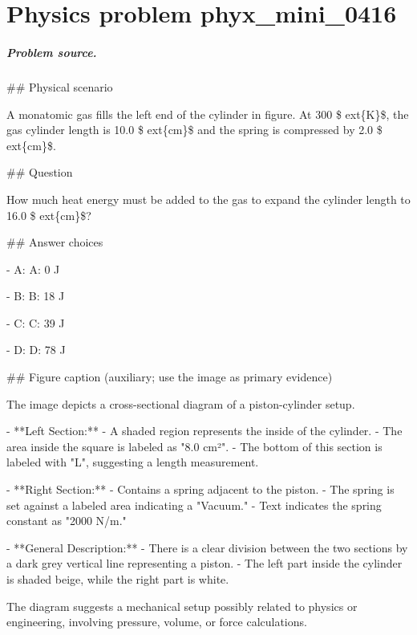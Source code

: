 
\chapter{Physics problem phyx\_mini\_0416}
\label{ch:PhyXMiniProblems_problem_phyx_mini_0416}

\paragraph{Problem source.}
\#\# Physical scenario

A monatomic gas fills the left end of the cylinder in figure. At 300 \$	ext\{K\}\$, the gas cylinder length is 10.0 \$	ext\{cm\}\$ and the spring is compressed by 2.0 \$	ext\{cm\}\$.

\#\# Question

How much heat energy must be added to the gas to expand the cylinder length to 16.0 \$	ext\{cm\}\$?

\#\# Answer choices

- A: A: 0 J

- B: B: 18 J

- C: C: 39 J

- D: D: 78 J

\#\# Figure caption (auxiliary; use the image as primary evidence)

The image depicts a cross-sectional diagram of a piston-cylinder setup.

- **Left Section:**
  - A shaded region represents the inside of the cylinder.
  - The area inside the square is labeled as "8.0 cm²".
  - The bottom of this section is labeled with "L", suggesting a length measurement.

- **Right Section:**
  - Contains a spring adjacent to the piston.
  - The spring is set against a labeled area indicating a "Vacuum."
  - Text indicates the spring constant as "2000 N/m."

- **General Description:**
  - There is a clear division between the two sections by a dark grey vertical line representing a piston.
  - The left part inside the cylinder is shaded beige, while the right part is white.
  
The diagram suggests a mechanical setup possibly related to physics or engineering, involving pressure, volume, or force calculations.

